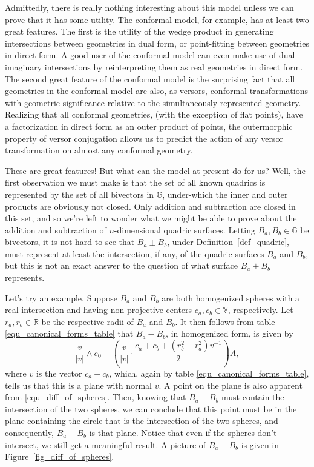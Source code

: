 \documentclass{ecgd-l}
\newcommand{\G}{\mathbb{G}}
\newcommand{\V}{\mathbb{V}}
\newcommand{\R}{\mathbb{R}}
\theoremstyle{definition}
\theoremstyle{remark}
\numberwithin{equation}{section}
\begin{document}
Admittedly, there is really nothing interesting about this model unless we can
prove that it has some utility.  The conformal model, for example, has at least
two great features.  The first is the utility of the wedge product in generating
intersections between geometries in dual form, or point-fitting between
geometries in direct form.  A good user of the conformal model can even
make use of dual imaginary intersections by reinterpreting them as real geometries
in direct form.  The second great feature of the conformal model is the
surprising fact that all geometries in the conformal model are also, as versors, conformal transformations
with geometric significance relative to the simultaneously represented geometry.
Realizing that all conformal geometries, (with the exception of flat points), have
a factorization in direct form as an outer product of points, the outermorphic
property of versor conjugation allows us to predict the action of any versor
transformation on almost any conformal geometry.

These are great features!  But what can the model at present do for us?  Well,
the first observation we must make is that the set of all known quadrics
is represented by the set of all bivectors in $\G$, under-which the inner
and outer products are obviously not closed.  Only addition and subtraction
are closed in this set, and so we're left to wonder what we might be able
to prove about the addition and subtraction of $n$-dimensional quadric surfaces.
Letting $B_a,B_b\in\G$ be bivectors, it is not hard to see that $B_a\pm B_b$, under
Definition~\ref{def_quadric}, must represent at least the intersection, if any,
of the quadric surfaces $B_a$ and $B_b$, but this is not an exact answer to the
question of what surface $B_a\pm B_b$ represents.

Let's try an example.  Suppose $B_a$ and $B_b$ are both homogenized spheres with
a real intersection and having
non-projective centers $c_a,c_b\in\V$, respectively.  Let $r_a,r_b\in\R$
be the respective radii of $B_a$ and $B_b$.  It then follows from
table \eqref{equ_canonical_forms_table} that $B_a-B_b$, in homogenized
form, is given by
\begin{equation}\label{equ_diff_of_spheres}
\frac{v}{|v|}\wedge\overline{e_0}-\left(\frac{v}{|v|}\cdot\frac{c_a+c_b+(r_b^2-r_a^2)v^{-1}}{2}\right)A,
\end{equation}
where $v$ is the vector $c_a-c_b$, which, again by table \eqref{equ_canonical_forms_table},
tells us that this is a plane with normal $v$.  A point on the plane is also apparent from
\eqref{equ_diff_of_spheres}.  Then, knowing that $B_a-B_b$ must contain the intersection of the
two spheres, we can conclude that this point must be in the plane containing the circle that is
the intersection of the two spheres, and consequently, $B_a-B_b$ is that plane.  Notice
that even if the spheres don't intersect, we still get a meaningful result.  A picture of
$B_a-B_b$ is given in Figure~\ref{fig_diff_of_spheres}.
\end{document}
